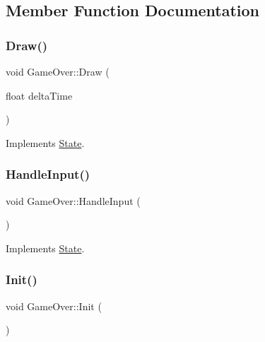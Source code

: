 \subsection{Member Function Documentation}
\mbox{\label{classGameOver_a263a49026ce81b22721cfc515f8efd4e}} 
\subsubsection{\texorpdfstring{Draw()}{Draw()}}
{\footnotesize\ttfamily void Game\+Over\+::\+Draw (\begin{DoxyParamCaption}\item[{float}]{delta\+Time }\end{DoxyParamCaption})\hspace{0.3cm}{\ttfamily [virtual]}}



Implements \mbox{\hyperlink{classState_ae3bc988c6103665bca68560742fb40e1}{State}}.

\mbox{\label{classGameOver_a1b90d0ed04386fe166cbfcf2427a5175}} 
\subsubsection{\texorpdfstring{Handle\+Input()}{HandleInput()}}
{\footnotesize\ttfamily void Game\+Over\+::\+Handle\+Input (\begin{DoxyParamCaption}{ }\end{DoxyParamCaption})\hspace{0.3cm}{\ttfamily [virtual]}}



Implements \mbox{\hyperlink{classState_ad3de659bdeb45c97486464461d625e8f}{State}}.

\mbox{\label{classGameOver_ac13d1bd0fe9f8db0ef0301c9ec63a9e0}} 
\subsubsection{\texorpdfstring{Init()}{Init()}}
{\footnotesize\ttfamily void Game\+Over\+::\+Init (\begin{DoxyParamCaption}{ }\end{DoxyParamCaption})\hspace{0.3cm}{\ttfamily [virtual]}}



